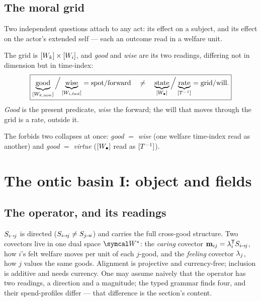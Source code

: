 \documentclass[../main]{subfiles}
\begin{document}
\subsection{The moral grid}
\label{subsec:epi:grid}
%
%
Two independent questions attach to any act: its effect on a subject, and its effect on the
actor's extended self --- each an outcome read in a welfare unit.

\begin{definition}
  The grid is $[W\sb{k}]\times[W\sb{i}]$, and \emph{good} and \emph{wise} are its two
  readings, differing not in dimension but in time-index:
  \begin{equation}
    \boxed{\underbrace{\text{good}}_{[W\sb{k,\text{now}}]}\Big/
           \underbrace{\text{wise}}_{[W\sb{i,\text{fwd}}]}=\text{spot}/\text{forward}
    \quad\neq\quad
    \underbrace{\text{state}}_{[W\sb{\bullet}]}\Big/\underbrace{\text{rate}}_{[T\sp{-1}]}
    =\text{grid}/\text{will}.}
    \label{eq:nrm:grid}
  \end{equation}
  \emph{Good} is the present predicate, \emph{wise} the forward; the will that moves through
  the grid is a rate, outside it.
\end{definition}

The  forbids two collapses at once: \emph{good} $=$ \emph{wise} (one welfare
time-index read as another) and \emph{good} $=$ \emph{virtue} ($[W\sb{\bullet}]$ read as
$[T\sp{-1}]$).

\clearpage
\section{The ontic basin I: object and fields}
\label{sec:ontic-fields}

\subsection{The operator, and its readings}
\label{subsec:ont:operator}
%
%
$S\sb{ i\!\to\!j }$ is directed ($S\sb{ i\!\to\!j }\neq S\sb{ j\!\to\!i }$) and carries the full cross-good
structure. Two covectors live in one dual space $\dualspace$: the \emph{caring}
covector $\mathbf{m}\sb{ ij }=\lambda\sb{i}\sp{\mathsf{T}}S\sb{ i\!\to\!j }$, how $i$'s felt welfare moves per
unit of each $j$-good, and the \emph{feeling} covector $\lambda\sb{j}$, how $j$ values
the same goods. Alignment is projective and currency-free; inclusion is additive and needs
currency. One may assume naively that the operator has two readings, a direction and a
magnitude; the typed grammar finds four, and their spend-profiles differ --- that
difference is the section's content.
\end{document}
